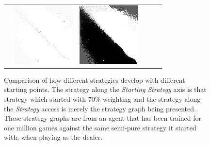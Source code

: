 \begin{figure}
\begin{tabular}{ l l l l l l }
		&\parbox[c]{1em}{\includegraphics[width=\stratgraphwidthmed]{images/findings/experiments/starting_points/matrix_handmaxmed_handmaxposs-7.png}}
		&\parbox[c]{1em}{\includegraphics[width=\stratgraphwidthmed]{images/findings/experiments/starting_points/matrix_handmaxmed_handmaxmed-7.png}}
	\\
\end{tabular}

\caption{
	Comparison of how different strategies develop with different
	starting points.
	The strategy along the \textit{Starting Strategy} axis is that strategy
	which started with 70\% weighting
	and the strategy along the \textit{Strategy} access is
	merely the strategy graph being presented.
	These strategy graphs are from an agent that has been trained for one
	million games
	against the same semi-pure strategy it started with,
	when playing as the dealer.
}
\label{fig:findings-expts-sanitycheck-matrix}
\end{figure}
